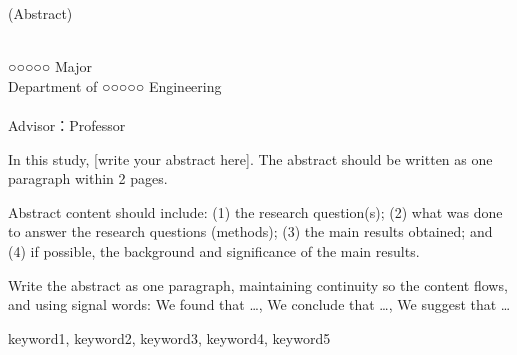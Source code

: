 
\clearpage
\thispagestyle{fancy}
\begin{flushright}
  {\fontsize{12}{20}\selectfont (Abstract)}
\end{flushright}

\begin{center}
\parbox{0.9\textwidth}{
\centering
{\fontsize{20}{26}\selectfont \thesistitlenone}
}
\end{center}
\begin{center}
{\fontsize{15}{26}\selectfont \thesistitlentwo}
\end{center}


\vspace{10mm}

\begin{flushright}
  {\fontsize{14}{18}\selectfont \authornameEN}\\
  {\fontsize{14}{18}\selectfont ○○○○○ Major}\\
  {\fontsize{14}{18}\selectfont Department of ○○○○○ Engineering}\\
  {\fontsize{14}{18}\selectfont \gradschool}\\
  {\fontsize{14}{18}\selectfont Advisor：Professor \advisorname}
\end{flushright}

\vspace{8mm}

\begingroup
\setmainfont{Times New Roman}
\fontsize{12}{18}\selectfont   %
\setlength{\parindent}{10pt}

In this study, [write your abstract here]. The abstract should be written as one paragraph within 2 pages.

Abstract content should include: (1) the research question(s); (2) what was done to answer the research questions (methods); (3) the main results obtained; and (4) if possible, the background and significance of the main results.

Write the abstract as one paragraph, maintaining continuity so the content flows, and using signal words: We found that \ldots, We conclude that \ldots, We suggest that \ldots

\endgroup

\vspace{\baselineskip}

 {\fontsize{12}{16}\selectfont keyword1, keyword2, keyword3, keyword4, keyword5}

\newpage
